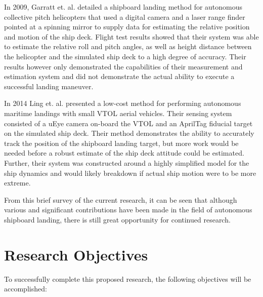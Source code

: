 \documentclass[12pt, letterpaper]{article}
\begin{document}

In 2009, Garratt et. al. \cite{Garratt2009} detailed a shipboard landing method for autonomous collective pitch helicopters that used a digital camera and a laser range finder pointed at a spinning mirror to supply data for estimating the relative position and motion of the ship deck.  Flight test results showed that their system was able to estimate the relative roll and pitch angles, as well as height distance between the helicopter and the simulated ship deck to a high degree of accuracy.  Their results however only demonstrated the capabilities of their measurement and estimation system and did not demonstrate the actual ability to execute a successful landing maneuver.
  
In 2014 Ling et. al. \cite{Ling2014} presented a low-cost method for performing autonomous maritime landings with small VTOL aerial vehicles.  Their sensing system consisted of a uEye camera on-board the VTOL and an AprilTag fiducial target on the simulated ship deck.  Their method demonstrates the ability to accurately track the position of the shipboard landing target, but more work would be needed before a robust estimate of the ship deck attitude could be estimated.  Further, their system was constructed around a highly simplified model for the ship dynamics and would likely breakdown if actual ship motion were to be more extreme.   


From this brief survey of the current research, it can be seen that although various and significant contributions have been made in the field of autonomous shipboard landing, there is still great opportunity for continued research.

\section{Research Objectives}

To successfully complete this proposed research, the following objectives will be accomplished:
\end{document}
